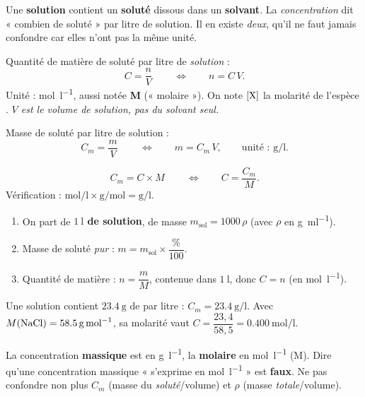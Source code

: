 \documentclass[11pt,a4paper]{article}
\begin{document}
\noindent
Une \textbf{solution} contient un \textbf{soluté} dissous dans un \textbf{solvant}. La
\emph{concentration} dit « combien de soluté » par litre de solution. Il en existe \emph{deux}, qu'il
ne faut jamais confondre car elles n'ont pas la même unité.

\begin{cle}
Quantité de matière de soluté par litre de \emph{solution} :
\[ \boxed{\,C = \dfrac{n}{V}\,}\qquad\Longleftrightarrow\qquad n = C\,V. \]
Unité : \si{\mole\per\litre}, aussi notée \textbf{M} (« molaire »). On note $[\ce{X}]$ la molarité
de l'espèce . \emph{$V$ est le volume de solution, pas du solvant seul.}
\end{cle}

\begin{cle}
Masse de soluté par litre de solution :
\[ \boxed{\,C_m = \dfrac{m}{V}\,}\qquad\Longleftrightarrow\qquad m = C_m\,V,\qquad \text{unité : }\si{\gram\per\litre}. \]
\end{cle}

\begin{cle}
\[ \boxed{\,C_m = C\times M\,}\qquad\Longleftrightarrow\qquad C = \dfrac{C_m}{M}. \]
Vérification : $\si{\mole\per\litre}\times\si{\gram\per\mole} = \si{\gram\per\litre}$.
\end{cle}

\begin{methode}
\begin{enumerate}[leftmargin=1.5em,topsep=1pt,itemsep=1pt]
  \item On part de \textbf{$\SI{1}{\litre}$ de solution}, de masse $m_{\text{sol}} = 1000\,\rho$ (avec $\rho$ en \si{\gram\per\milli\litre}).
  \item Masse de soluté \emph{pur} : $m = m_{\text{sol}}\times \dfrac{\%}{100}$.
  \item Quantité de matière : $n = \dfrac{m}{M}$, contenue dans $\SI{1}{\litre}$, donc $C = n$ (en \si{\mole\per\litre}).
\end{enumerate}
\end{methode}

\begin{exemplebox}
Une solution contient $\SI{23.4}{\gram}$ de  par litre : $C_m = \SI{23.4}{\gram\per\litre}$.
Avec $M(\ce{NaCl}) = \SI{58.5}{\gram\per\mole}$, sa molarité vaut $C = \dfrac{23{,}4}{58{,}5} = \SI{0.400}{\mole\per\litre}$.
\end{exemplebox}

\begin{piege}
La concentration \textbf{massique} est en \si{\gram\per\litre}, la \textbf{molaire} en \si{\mole\per\litre}
(M). Dire qu'une concentration massique « s'exprime en \si{\mole\per\litre} » est \textbf{faux}. Ne pas
confondre non plus $C_m$ (masse du \emph{soluté}/volume) et $\rho$ (masse \emph{totale}/volume).
\end{piege}
\end{document}
